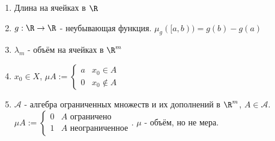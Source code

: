 \begin{example}[объёма] \thmslashn

    \begin{enumerate}
        \item Длина на ячейках в $\R$
        \item $g : \R \to \R$ - неубывающая функция. $\mu_{g}([a, b)) = g(b) - g(a)$
        \item $\lambda_{m}$ - объём на ячейках в $\R^{m}$
        \item $x_0\in X$, $\mu A := \begin{cases}
                a & x_0\in A\\
                0 & x_0 \not\in A
        \end{cases}$
    \item $\mathcal{A}$ - алгебра ограниченных множеств и их дополнений в  $\R^{m}$, $A\in \mathcal{A}$. $\mu A := \begin{cases}
            0 & A  \text{ ограничено}\\
            1 & A \text{ неограниченное}
    \end{cases}$. $\mu$ - объём, но не мера.
    \end{enumerate}
\end{example}
